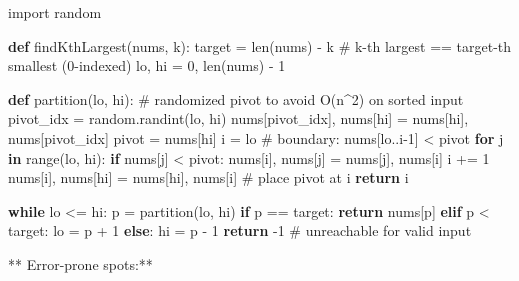 \documentclass[11pt]{article}
\newenvironment{Shaded}{\begin{snugshade}}{\end{snugshade}}
\newcommand{\BuiltInTok}[1]{\textcolor[rgb]{0.50,0.55,0.55}{#1}}
\newcommand{\CommentTok}[1]{\textcolor[rgb]{0.48,0.49,0.49}{#1}}
\newcommand{\ControlFlowTok}[1]{\textcolor[rgb]{0.99,0.74,0.29}{\textbf{#1}}}
\newcommand{\DecValTok}[1]{\textcolor[rgb]{0.96,0.45,0.00}{#1}}
\newcommand{\ImportTok}[1]{\textcolor[rgb]{0.15,0.68,0.38}{#1}}
\newcommand{\KeywordTok}[1]{\textcolor[rgb]{0.81,0.81,0.76}{\textbf{#1}}}
\newcommand{\NormalTok}[1]{\textcolor[rgb]{0.81,0.81,0.76}{#1}}
\newcommand{\OperatorTok}[1]{\textcolor[rgb]{0.81,0.81,0.76}{#1}}
\begin{document}

\begin{Shaded}
\begin{Highlighting}[]
\ImportTok{import}\NormalTok{ random}

\KeywordTok{def}\NormalTok{ findKthLargest(nums, k):}
\NormalTok{    target }\OperatorTok{=} \BuiltInTok{len}\NormalTok{(nums) }\OperatorTok{{-}}\NormalTok{ k  }\CommentTok{\# k{-}th largest == target{-}th smallest (0{-}indexed)}
\NormalTok{    lo, hi }\OperatorTok{=} \DecValTok{0}\NormalTok{, }\BuiltInTok{len}\NormalTok{(nums) }\OperatorTok{{-}} \DecValTok{1}

    \KeywordTok{def}\NormalTok{ partition(lo, hi):}
        \CommentTok{\# randomized pivot to avoid O(n\^{}2) on sorted input}
\NormalTok{        pivot\_idx }\OperatorTok{=}\NormalTok{ random.randint(lo, hi)}
\NormalTok{        nums[pivot\_idx], nums[hi] }\OperatorTok{=}\NormalTok{ nums[hi], nums[pivot\_idx]}
\NormalTok{        pivot }\OperatorTok{=}\NormalTok{ nums[hi]}
\NormalTok{        i }\OperatorTok{=}\NormalTok{ lo  }\CommentTok{\# boundary: nums[lo..i{-}1] \textless{} pivot}
        \ControlFlowTok{for}\NormalTok{ j }\KeywordTok{in} \BuiltInTok{range}\NormalTok{(lo, hi):}
            \ControlFlowTok{if}\NormalTok{ nums[j] }\OperatorTok{\textless{}}\NormalTok{ pivot:}
\NormalTok{                nums[i], nums[j] }\OperatorTok{=}\NormalTok{ nums[j], nums[i]}
\NormalTok{                i }\OperatorTok{+=} \DecValTok{1}
\NormalTok{        nums[i], nums[hi] }\OperatorTok{=}\NormalTok{ nums[hi], nums[i]  }\CommentTok{\# place pivot at i}
        \ControlFlowTok{return}\NormalTok{ i}

    \ControlFlowTok{while}\NormalTok{ lo }\OperatorTok{\textless{}=}\NormalTok{ hi:}
\NormalTok{        p }\OperatorTok{=}\NormalTok{ partition(lo, hi)}
        \ControlFlowTok{if}\NormalTok{ p }\OperatorTok{==}\NormalTok{ target:}
            \ControlFlowTok{return}\NormalTok{ nums[p]}
        \ControlFlowTok{elif}\NormalTok{ p }\OperatorTok{\textless{}}\NormalTok{ target:}
\NormalTok{            lo }\OperatorTok{=}\NormalTok{ p }\OperatorTok{+} \DecValTok{1}
        \ControlFlowTok{else}\NormalTok{:}
\NormalTok{            hi }\OperatorTok{=}\NormalTok{ p }\OperatorTok{{-}} \DecValTok{1}
    \ControlFlowTok{return} \OperatorTok{{-}}\DecValTok{1}  \CommentTok{\# unreachable for valid input}
\end{Highlighting}
\end{Shaded}

** Error-prone spots:**
\end{document}
